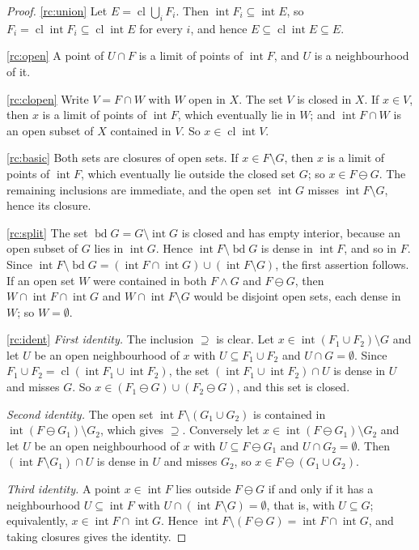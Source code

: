 \documentclass[11pt,reqno]{amsart}
\theoremstyle{plain}
\theoremstyle{definition}
\theoremstyle{remark}
\newcommand{\cl}{\operatorname{cl}}
\newcommand{\intr}{\operatorname{int}}
\newcommand{\bd}{\operatorname{bd}}
\newcommand{\rd}{\ominus}
\begin{document}
\begin{proof}
\ref{rc:union} Let $E=\cl\bigcup_iF_i$. Then $\intr F_i\subseteq\intr E$, so $F_i=\cl\intr F_i\subseteq\cl\intr E$ for every $i$, and hence $E\subseteq\cl\intr E\subseteq E$.

\ref{rc:open} A point of $U\cap F$ is a limit of points of $\intr F$, and $U$ is a neighbourhood of it.

\ref{rc:clopen} Write $V=F\cap W$ with $W$ open in $X$. The set $V$ is closed in $X$. If $x\in V$, then $x$ is a limit of points of $\intr F$, which eventually lie in $W$; and $\intr F\cap W$ is an open subset of $X$ contained in $V$. So $x\in\cl\intr V$.

\ref{rc:basic} Both sets are closures of open sets. If $x\in F\setminus G$, then $x$ is a limit of points of $\intr F$, which eventually lie outside the closed set $G$; so $x\in F\rd G$. The remaining inclusions are immediate, and the open set $\intr G$ misses $\intr F\setminus G$, hence its closure.

\ref{rc:split} The set $\bd G=G\setminus\intr G$ is closed and has empty interior, because an open subset of $G$ lies in $\intr G$. Hence $\intr F\setminus\bd G$ is dense in $\intr F$, and so in $F$. Since $\intr F\setminus\bd G=(\intr F\cap\intr G)\cup(\intr F\setminus G)$, the first assertion follows. If an open set $W$ were contained in both $F\wedge G$ and $F\rd G$, then $W\cap\intr F\cap\intr G$ and $W\cap\intr F\setminus G$ would be disjoint open sets, each dense in $W$; so $W=\emptyset$.

\ref{rc:ident} \emph{First identity.} The inclusion $\supseteq$ is clear. Let $x\in\intr(F_1\cup F_2)\setminus G$ and let $U$ be an open neighbourhood of $x$ with $U\subseteq F_1\cup F_2$ and $U\cap G=\emptyset$. Since $F_1\cup F_2=\cl(\intr F_1\cup\intr F_2)$, the set $(\intr F_1\cup\intr F_2)\cap U$ is dense in $U$ and misses $G$. So $x\in(F_1\rd G)\cup(F_2\rd G)$, and this set is closed.

\emph{Second identity.} The open set $\intr F\setminus(G_1\cup G_2)$ is contained in $\intr(F\rd G_1)\setminus G_2$, which gives $\supseteq$. Conversely let $x\in\intr(F\rd G_1)\setminus G_2$ and let $U$ be an open neighbourhood of $x$ with $U\subseteq F\rd G_1$ and $U\cap G_2=\emptyset$. Then $(\intr F\setminus G_1)\cap U$ is dense in $U$ and misses $G_2$, so $x\in F\rd(G_1\cup G_2)$.

\emph{Third identity.} A point $x\in\intr F$ lies outside $F\rd G$ if and only if it has a neighbourhood $U\subseteq\intr F$ with $U\cap(\intr F\setminus G)=\emptyset$, that is, with $U\subseteq G$; equivalently, $x\in\intr F\cap\intr G$. Hence $\intr F\setminus(F\rd G)=\intr F\cap\intr G$, and taking closures gives the identity.
\end{proof}
\end{document}
